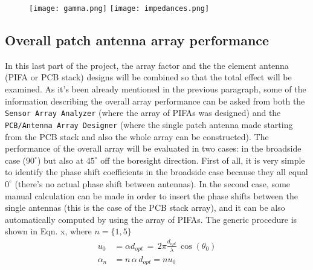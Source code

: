 \documentclass[12pt,a4paper]{article}
\begin{document}
{	\begin{center}
		\begin{figure}
			\texttt{[image: gamma.png]}
			\texttt{[image: impedances.png]}
		\end{figure}
	\end{center}
\subsection*{\selectfont\color{Turquoise}Overall patch antenna array performance}
In this last part of the project, the array factor and the the element antenna (PIFA or PCB stack) designs will be combined so that the total effect will be examined. As it's been already mentioned in the previous paragraph, some of the information describing the overall array performance can be asked from both the \texttt{\color{Mahogany}Sensor Array Analyzer} (where the array of PIFAs was designed) and the \texttt{\color{Mahogany}PCB/Antenna Array Designer} (where the single patch antenna made starting from the PCB stack and also the whole array can be constructed). The performance of the overall array will be evaluated in two cases: in the broadside case ($90^\circ$) but also at $45^\circ$ off the boresight direction. First of all, it is very simple to identify the phase shift coefficients in the broadside case because they all equal $0^\circ$ (there's no actual phase shift between antennas). In the second case, some manual calculation can be made in order to insert the phase shifts between the single antennas (this is the case of the PCB stack array), and it can be also automatically computed by using the array of PIFAs. The generic procedure is shown in Eqn. x, where $n=\{1,5\}$ 
\begin{equation}
	\begin{aligned}
		u_0&=\alpha d_{opt}\,=\,2\pi\frac{d_{opt}}{\lambda}\,\cos(\theta_0)\\
	\alpha_n&=n\,\alpha\,d_{opt}=nu_0
\end{aligned}
\end{equation}
}
\end{document}
